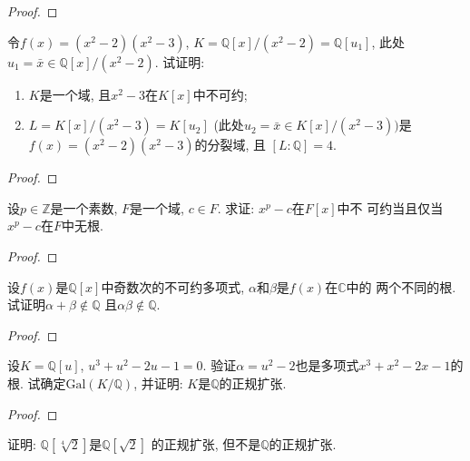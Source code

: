 \begin{proof}
    
\end{proof}

\begin{problem}
    令$f(x) = (x^2 - 2)(x^2 - 3)$,
$K = \mathbb{Q}[x]/(x^2 - 2) = \mathbb{Q}[u_1]$,
此处$u_1 = \bar{x} \in \mathbb{Q}[x]/(x^2 - 2)$.
试证明: 
\begin{enumerate}[(1)]
    \item $K$是一个域, 且$x^2 - 3$在$K[x]$中不可约;
    \item $L = K[x]/(x^2 - 3) = K[u_2]$
(此处$u_2 = \bar{x} \in K[x]/(x^2 - 3))$是
$f(x) = (x^2 - 2)(x^2 - 3)$的分裂域, 且
$[L:\mathbb{Q}] = 4$.
\end{enumerate}
\end{problem}

\begin{proof}
    
\end{proof}

\begin{problem}
    设$p \in \mathbb{Z}$是一个素数, $F$是一个域,
$c\in F$. 求证: $x^p - c$在$F[x]$中不
可约当且仅当$x^p - c$在$F$中无根.
\end{problem}

\begin{proof}
    
\end{proof}

\begin{problem}
    设$f(x)$是$\mathbb{Q}[x]$中奇数次的不可约多项式,
$\alpha$和$\beta$是$f(x)$在$\mathbb{C}$中的
两个不同的根. 试证明$\alpha + \beta \notin \mathbb{Q}$
且$\alpha\beta \notin \mathbb{Q}$.
\end{problem}

\begin{proof}
    
\end{proof}

\begin{problem}
    设$K = \mathbb{Q}[u]$, $u^3 + u^2 - 2u - 1 = 0$.
验证$\alpha = u^2 - 2$也是多项式$x^3 + x^2 - 2x - 1$的根.
试确定$\mathrm{Gal}(K/\mathbb{Q})$,
并证明: $K$是$\mathbb{Q}$的正规扩张.
\end{problem}

\begin{proof}
    
\end{proof}

\begin{problem}
    证明: $\mathbb{Q}[\sqrt[4]{2}]$是$\mathbb{Q}[\sqrt{2}]$
的正规扩张, 但不是$\mathbb{Q}$的正规扩张.
\end{problem}

